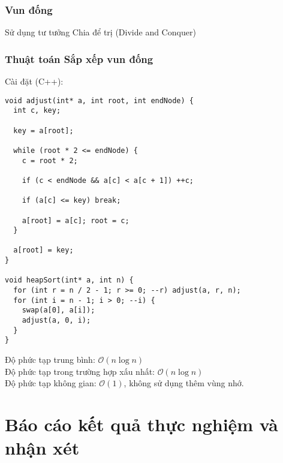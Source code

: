\documentclass[]{article}
\begin{document}
\subsubsection{Vun đống}
Sử dụng tư tưởng Chia để trị (Divide and Conquer)\cite{LMHoang}

\subsubsection{Thuật toán Sắp xếp vun đống}

Cài đặt (C++):
\begin{lstlisting}
void adjust(int* a, int root, int endNode) {
  int c, key;

  key = a[root];

  while (root * 2 <= endNode) {
    c = root * 2;

    if (c < endNode && a[c] < a[c + 1]) ++c;

    if (a[c] <= key) break;

    a[root] = a[c]; root = c;
  }

  a[root] = key;
}

void heapSort(int* a, int n) {
  for (int r = n / 2 - 1; r >= 0; --r) adjust(a, r, n);
  for (int i = n - 1; i > 0; --i) {
    swap(a[0], a[i]);
    adjust(a, 0, i);
  }
}
\end{lstlisting}
Độ phức tạp trung bình: $\mathcal{O}(n \log n)$
\\
Độ phức tạp trong trường hợp xấu nhất: $\mathcal{O}(n \log n)$
\\
Độ phức tạp không gian: $\mathcal{O}(1)$, không sử dụng thêm vùng nhớ.

\section{Báo cáo kết quả thực nghiệm và nhận xét}
\end{document}
